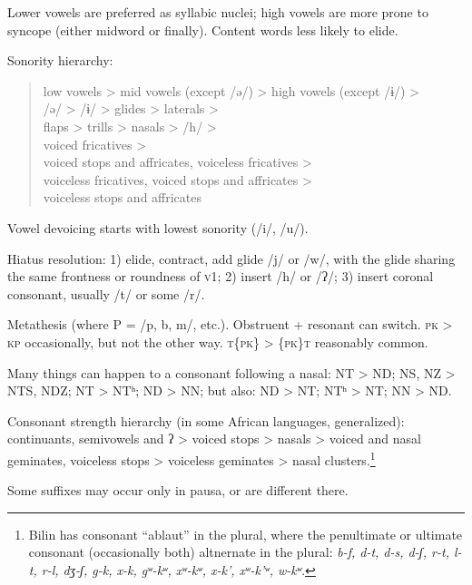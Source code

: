 \documentclass[11pt]{article}
\newcommand{\I}[1]{\textsc{#1}}   %
\begin{document}
Lower vowels are preferred as syllabic nuclei; high vowels are more
prone to syncope (either midword or finally).  Content words less
likely to elide.

Sonority hierarchy:
\begin{quotation}
\noindent low vowels > mid vowels (except /ə/) > high vowels (except /ɨ/) > \\
\indent /ə/ > /ɨ/ > glides > laterals > \\
\indent flaps > trills > nasals > /h/ > \\
\indent voiced fricatives > \\
\indent voiced stops and affricates, voiceless fricatives > \\
\indent voiceless fricatives, voiced stops and affricates > \\
\indent voiceless stops and affricates
\end{quotation}

Vowel devoicing starts with lowest sonority  (/i/, /u/).

Hiatus resolution: 1) elide, contract, add glide /j/ or /w/, with the
glide sharing the same frontness or roundness of \I{v1}; 2)
insert /h/ or /ʔ/; 3) insert coronal consonant, usually /t/ or some
/r/.

Metathesis (where P = /p, b, m/, etc.).  Obstruent + resonant can
switch.  \I{pk} > \I{kp} occasionally, but not the other way.
\I{t\{pk\}} > \I{\{pk\}t} reasonably common.

Many things can happen to a consonant following a nasal: NT > ND; NS,
NZ > NTS, NDZ; NT > NTʰ; ND > NN; but also: ND > NT; NTʰ > NT; NN >
ND.

Consonant strength hierarchy (in some African languages, generalized):
continuants, semivowels and ʔ > voiced stops > nasals > voiced and
nasal geminates, voiceless stops > voiceless geminates > nasal
clusters.\footnote{Bilin has consonant ``ablaut'' in the plural, where
  the penultimate or ultimate consonant (occasionally both) altnernate
  in the plural: \textit{b-f, d-t, d-s, d-ʃ, r-t, l-t, r-l, dʒ-ʃ, g-k,
    x-k, gʷ-kʷ, xʷ-kʷ, x-k', xʷ-k'ʷ, w-kʷ}.}

Some suffixes may occur only in pausa, or are different there.
\end{document}
